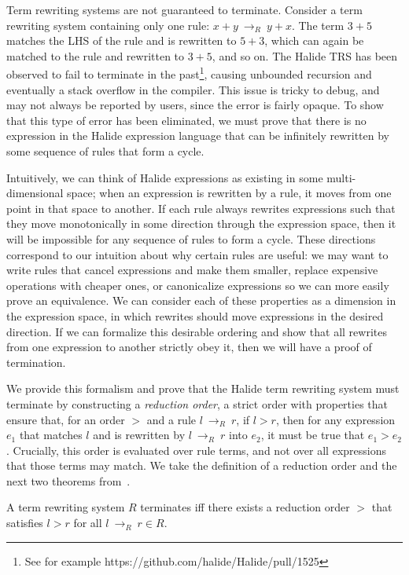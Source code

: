 \documentclass[acmsmall,review,anonymous]{acmart}\settopmatter{printfolios=true,printccs=false,printacmref=false}
\newcommand{\rewrites}[0]{\:\rightarrow_{R}\:}
\begin{document}
Term rewriting systems are not guaranteed to terminate. Consider a term
rewriting system containing only one rule: $x + y \rewrites y + x$. The term
$3 + 5$ matches the LHS of the rule and is rewritten to $5 + 3$, which can again
be matched to the rule and rewritten to $3 + 5$, and so on. The Halide TRS has been observed to fail to terminate in the past\footnote{See for example https://github.com/halide/Halide/pull/1525}, causing unbounded recursion and eventually a stack overflow in the compiler. This issue is tricky to debug, and may not always be reported by users, since the error is fairly opaque. To show that this type of error has been eliminated, we must prove that there is no expression in the Halide expression language that can be infinitely rewritten by some sequence of rules that form a cycle.

Intuitively, we can think of Halide expressions as existing in some multi-dimensional space; when an expression is rewritten by a rule, it moves from one point in that space to another. If each rule always rewrites expressions such that they move monotonically in some direction through the expression space, then it will be impossible for any sequence of rules to form a cycle. These directions correspond to our intuition about why certain rules are useful: we may want to write rules that cancel expressions and make them smaller, replace expensive operations with cheaper ones, or canonicalize expressions so we can more easily prove an equivalence. We can consider each of these properties as a dimension in the expression space, in which rewrites should move expressions in the desired direction. If we can formalize this desirable ordering and show that all rewrites from one expression to another strictly obey it, then we will have a proof of termination.

We provide this formalism and prove that the Halide term rewriting system must terminate by constructing a \emph{reduction order}, a strict order with properties that ensure that, for an order $>$ and a rule $l \rewrites r$, if $l > r$, then for any expression $e_1$ that matches $l$ and is rewritten by $l \rewrites r$ into $e_2$, it must be true that $e_1 > e_2$. Crucially, this order is evaluated over rule terms, and not over all expressions that those terms may match. We take the definition of a reduction order and the next two theorems from~\citet{baader1999term}.

\begin{theorem}\label{theorem:terminates}
A term rewriting system $R$ terminates iff there exists a reduction order $>$ that satisfies $l > r$ for all $l \rewrites r \in R$.
\end{theorem}
\end{document}
